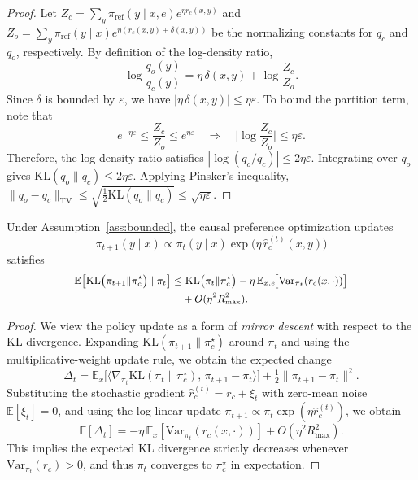 \begin{proof}
Let $Z_c=\sum_y \pi_{\mathrm{ref}}(y\mid x,e)e^{\eta r_c(x,y)}$ and 
$Z_o=\sum_y \pi_{\mathrm{ref}}(y\mid x)e^{\eta(r_c(x,y)+\delta(x,y))}$ 
be the normalizing constants for $q_c$ and $q_o$, respectively.  
By definition of the log-density ratio,
\[
\log\frac{q_o(y)}{q_c(y)}
= \eta\,\delta(x,y) + \log\frac{Z_c}{Z_o}.
\]
Since $\delta$ is bounded by $\varepsilon$, we have
$|\eta\,\delta(x,y)|\le \eta\varepsilon$.  
To bound the partition term, note that
\[
e^{-\eta\varepsilon} \le \frac{Z_c}{Z_o} \le e^{\eta\varepsilon}
\quad \Rightarrow \quad
\big|\log\frac{Z_c}{Z_o}\big| \le \eta\varepsilon.
\]
Therefore, the log-density ratio satisfies
$|\log(q_o/q_c)| \le 2\eta\varepsilon$.
Integrating over $q_o$ gives
$\mathrm{KL}(q_o\|q_c)\le 2\eta\varepsilon$.
Applying Pinsker’s inequality,
$\|q_o-q_c\|_{\mathrm{TV}}\le \sqrt{\tfrac{1}{2}\mathrm{KL}(q_o\|q_c)} \le \sqrt{\eta\varepsilon}$.
\end{proof}


\begin{lemma}
\label{lem:onestep}
Under Assumption~\ref{ass:bounded},
the causal preference optimization updates
\[
\pi_{t+1}(y\mid x)
\propto
\pi_t(y\mid x)
\exp\!\big(\eta\,\widehat r_c^{(t)}(x,y)\big)
\]
satisfies
\[
\small
\begin{aligned}
\mathbb{E}\!\left[\mathrm{KL}\big(\pi_{t+1}\|\pi_c^\star\big)\mid\pi_t\right]
&\le
\mathrm{KL}\big(\pi_t\|\pi_c^\star\big)
-
\eta\,\mathbb{E}_{x,e}\!\big[\mathrm{Var}_{\pi_t}(r_c(x,\cdot))\big]\\
&\quad
+ O(\eta^2R_{\max}^2).
\end{aligned}
\]

\end{lemma}

\begin{proof}
We view the policy update as a form of \emph{mirror descent}
with respect to the KL divergence.
Expanding $\mathrm{KL}(\pi_{t+1}\|\pi_c^\star)$ around $\pi_t$
and using the multiplicative-weight update rule,
we obtain the expected change
\[
\Delta_t
= \mathbb{E}_{x}\!\big[
\langle\nabla_{\pi_t}\mathrm{KL}(\pi_t\|\pi_c^\star),\,\pi_{t+1}-\pi_t\rangle
\big]
+ \tfrac{1}{2}\|\pi_{t+1}-\pi_t\|^2.
\]
Substituting the stochastic gradient 
$\widehat{r}_c^{(t)} = r_c + \xi_t$ 
with zero-mean noise $\mathbb{E}[\xi_t]=0$, 
and using the log-linear update
$\pi_{t+1}\propto \pi_t \exp(\eta \widehat{r}_c^{(t)})$,
we obtain
\[
\mathbb{E}[\Delta_t]
= -\eta\,\mathbb{E}_{x}[\mathrm{Var}_{\pi_t}(r_c(x,\cdot))]
+ O(\eta^2R_{\max}^2).
\]
This implies the expected KL divergence strictly decreases
whenever $\mathrm{Var}_{\pi_t}(r_c)>0$,
and thus $\pi_t$ converges to $\pi_c^\star$ in expectation.
\end{proof}


